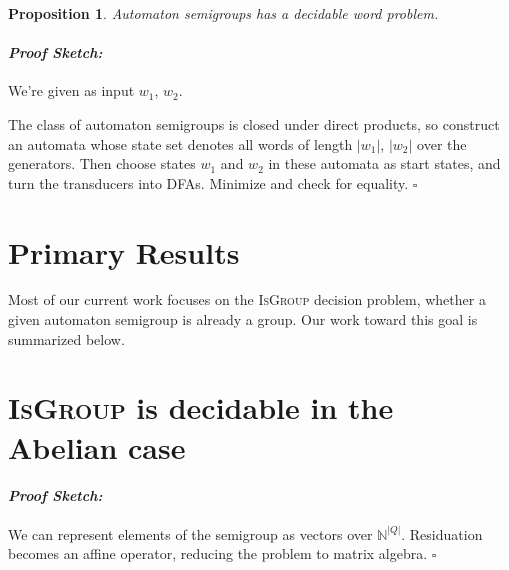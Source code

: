 \documentclass[a0]{a0poster}
\theoremstyle{pleasant}
\newtheorem{proposition}{Proposition}
\newtheorem{definition}{Definition}
\newenvironment{proofsketch}{\paragraph{\Large \normalfont \textit{Proof Sketch:}}}{\hfill$\square$}
\newcommand{\0}{\underline{0}}
\newcommand{\1}{\underline{1}}
\newcommand{\2}{\underline{2}}
\begin{document}
\begin{multicols}{3}


\begin{proposition}
Automaton semigroups has a decidable word problem.
\end{proposition}
\begin{proofsketch}
We're given as input $w_1$, $w_2$.

The class of automaton semigroups is closed under direct products, so construct an automata whose state set denotes all words of length $|w_1|$, $|w_2|$ over the generators. Then choose states $w_1$ and $w_2$ in these automata as start states, and turn the transducers into DFAs. Minimize and check for equality.
\end{proofsketch}

\section*{Primary Results}

Most of our current work focuses on the \textsc{IsGroup} decision problem, whether a given automaton semigroup is already a group. Our work toward this goal is summarized below.

\section*{\textsc{IsGroup} is decidable in the Abelian case}

\begin{proofsketch} 
We can represent elements of the semigroup as vectors over $\mathbb{N}^{|Q|}$. Residuation becomes an affine operator, reducing the problem to matrix algebra.
\end{proofsketch} 


\end{multicols}
\end{document}
